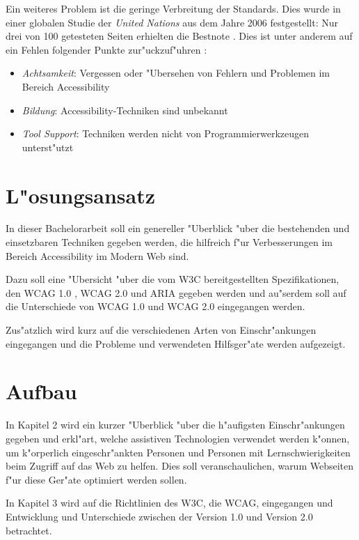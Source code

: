 \documentclass[a4paper,bibtotoc,oneside]{scrbook}
\begin{document}
Ein weiteres Problem ist die geringe Verbreitung der Standards. Dies wurde in einer globalen Studie der \emph{United Nations} aus dem Jahre 2006 festgestellt\cite{acc_report}: Nur drei von 100 getesteten Seiten erhielten die Bestnote \cite [S. 7]{acc_report}. Dies ist unter anderem auf ein Fehlen folgender Punkte zur"uckzuf"uhren \cite[S. 13]{tool_acc}: 

\begin{itemize}
\item \emph{Achtsamkeit}: Vergessen oder "Ubersehen von Fehlern und Problemen im Bereich Accessibility
\item \emph{Bildung}: Accessibility-Techniken sind unbekannt
\item \emph{Tool Support}: Techniken werden nicht von Programmierwerkzeugen unterst"utzt
\end{itemize}


\section{L"osungsansatz}
In dieser Bachelorarbeit soll ein genereller "Uberblick "uber die bestehenden und einsetzbaren Techniken gegeben werden, die hilfreich f"ur Verbesserungen im Bereich Accessibility im Modern Web sind. 

Dazu soll eine "Ubersicht "uber die vom W3C bereitgestellten Spezifikationen, den WCAG 1.0 \cite{wcag1}, WCAG 2.0 \cite{wcag2} und ARIA \cite{aria} gegeben werden und au"serdem soll auf die Unterschiede von WCAG 1.0 und WCAG 2.0 eingegangen werden.

Zus"atzlich wird kurz auf die verschiedenen Arten von Einschr"ankungen eingegangen und die Probleme und verwendeten Hilfsger"ate werden aufgezeigt.

\section{Aufbau}
In Kapitel 2 wird ein kurzer "Uberblick "uber die h"aufigsten Einschr"ankungen gegeben und erkl"art, welche assistiven Technologien verwendet werden k"onnen, um k"orperlich eingeschr"ankten Personen und Personen mit Lernschwierigkeiten beim Zugriff auf das Web zu helfen. Dies soll veranschaulichen, warum  Webseiten f"ur diese Ger"ate optimiert werden sollen.

In Kapitel 3 wird auf die Richtlinien des W3C, die WCAG, eingegangen und Entwicklung und Unterschiede zwischen der Version 1.0 und Version 2.0 betrachtet.
\end{document}
